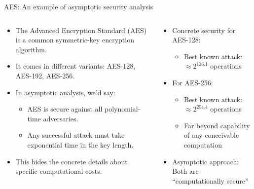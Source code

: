 \documentclass[aspectratio=169, lualatex, handout]{beamer}
\begin{document}
\begin{frame}{AES: An example of asymptotic security analysis}
	\begin{columns}[c]
		\begin{column}{0.5\textwidth}
			\begin{itemize}
				\item The Advanced Encryption Standard (AES) is a common symmetric-key encryption algorithm.
				\item It comes in different variants: AES-128, AES-192, AES-256.
				\item In asymptotic analysis, we'd say:
				      \begin{itemize}
					      \item AES is secure against all polynomial-time adversaries.
					      \item Any successful attack must take exponential time in the key length.
				      \end{itemize}
				\item This hides the concrete details about specific computational costs.
			\end{itemize}
		\end{column}
		\begin{column}{0.5\textwidth}
			\begin{itemize}
				\item Concrete security for AES-128:
				      \begin{itemize}
					      \item Best known attack: $\approx 2^{126.1}$ operations
				      \end{itemize}
				\item For AES-256:
				      \begin{itemize}
					      \item Best known attack: $\approx 2^{254.4}$ operations
					      \item Far beyond capability of any conceivable computation
				      \end{itemize}
				\item Asymptotic approach: Both are ``computationally secure''
			\end{itemize}
		\end{column}
	\end{columns}
\end{frame}
\end{document}
